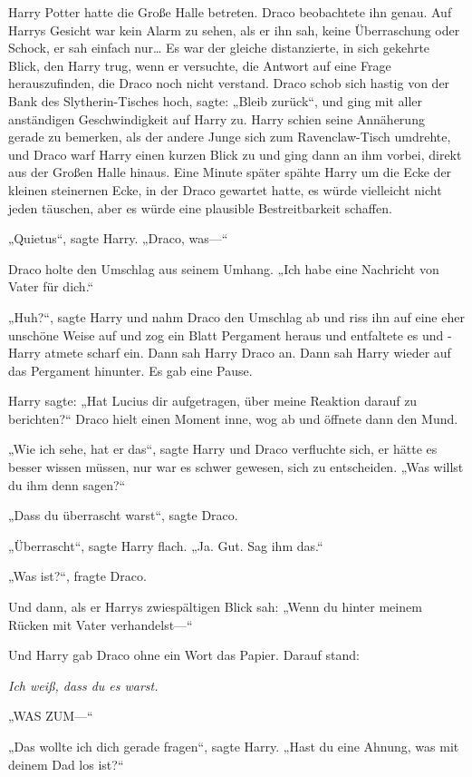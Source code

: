 {Harry Potter hatte die Große Halle betreten. Draco beobachtete ihn genau. Auf Harrys Gesicht war kein Alarm zu sehen, als er ihn sah, keine Überraschung oder Schock, er sah einfach nur… Es war der gleiche distanzierte, in sich gekehrte Blick, den Harry trug, wenn er versuchte, die Antwort auf eine Frage herauszufinden, die Draco noch nicht verstand. Draco schob sich hastig von der Bank des Slytherin-Tisches hoch, sagte: „Bleib zurück“, und ging mit aller anständigen Geschwindigkeit auf Harry zu. Harry schien seine Annäherung gerade zu bemerken, als der andere Junge sich zum Ravenclaw-Tisch umdrehte, und Draco warf Harry einen kurzen Blick zu und ging dann an ihm vorbei, direkt aus der Großen Halle hinaus. Eine Minute später spähte Harry um die Ecke der kleinen steinernen Ecke, in der Draco gewartet hatte, es würde vielleicht nicht jeden täuschen, aber es würde eine plausible Bestreitbarkeit schaffen.

„Quietus“, sagte Harry. „Draco, was—“

Draco holte den Umschlag aus seinem Umhang. „Ich habe eine Nachricht von Vater für dich.“

„Huh?“, sagte Harry und nahm Draco den Umschlag ab und riss ihn auf eine eher unschöne Weise auf und zog ein Blatt Pergament heraus und entfaltete es und - Harry atmete scharf ein. Dann sah Harry Draco an. Dann sah Harry wieder auf das Pergament hinunter. Es gab eine Pause.

Harry sagte: „Hat Lucius dir aufgetragen, über meine Reaktion darauf zu berichten?“ Draco hielt einen Moment inne, wog ab und öffnete dann den Mund.

„Wie ich sehe, hat er das“, sagte Harry und Draco verfluchte sich, er hätte es besser wissen müssen, nur war es schwer gewesen, sich zu entscheiden. „Was willst du ihm denn sagen?“

„Dass du überrascht warst“, sagte Draco.

„Überrascht“, sagte Harry flach. „Ja. Gut. Sag ihm das.“

„Was ist?“, fragte Draco.

Und dann, als er Harrys zwiespältigen Blick sah: „Wenn du hinter meinem Rücken mit Vater verhandelst—“

Und Harry gab Draco ohne ein Wort das Papier. Darauf stand:

\emph{Ich weiß, dass du es warst.}

„WAS ZUM—“

„Das wollte ich dich gerade fragen“, sagte Harry. „Hast du eine Ahnung, was mit deinem Dad los ist?“

}
